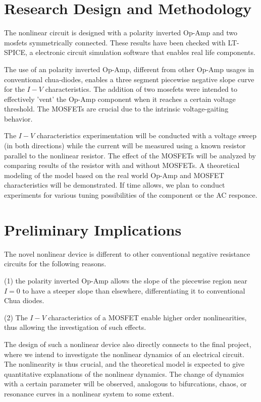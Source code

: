 \documentclass[12pt]{article}
\begin{document}
\section{Research Design and Methodology}


\quad The nonlinear circuit is designed with a polarity inverted Op-Amp and two mosfets symmetrically connected. These results have been checked with LT-SPICE, a electronic circuit simulation software that enables real life components.

The use of an polarity inverted Op-Amp, different from other Op-Amp usages in conventional chua-diodes, enables a three segment piecewise negative slope curve for the \(I-V\) characteristics.  The addition of two mosefets were intended to effectively 'vent' the Op-Amp component when it reaches a certain voltage threshold. The MOSFETs are crucial due to the intrinsic voltage-gaiting behavior.

The \(I-V\) characteristics experimentation will be conducted with a voltage sweep (in both directions) while the current will be measured using a known resistor parallel to the nonlinear resistor. The effect of the MOSFETs will be analyzed by comparing results of the resistor with and without MOSFETs. A theoretical modeling of the model based on the real world Op-Amp and MOSFET characteristics will be demonstrated. If time allows, we plan to conduct experiments for various tuning possibilities of the component or the AC responce. 

\section{Preliminary Implications}


\quad The novel nonlinear device is different to other conventional negative resistance circuits for the following reasons.

(1) the polarity inverted Op-Amp allows the slope of the piecewise region near $I=0$ to have a steeper slope than elsewhere, differentiating it to conventional Chua diodes.

(2) The \(I-V\) characteristics of a MOSFET enable higher order nonlinearities, thus allowing the investigation of such effects.


The design of such a nonlinear device also directly connects to the final project, where we intend to investigate the nonlinear dynamics of an electrical circuit. The nonlinearity is thus crucial, and the theoretical model is expected to give quantitative explanations of the nonlinear dynamics. The change of dynamics with a certain parameter will be observed, analogous to bifurcations, chaos, or resonance curves in a nonlinear system to some extent.
\end{document}
